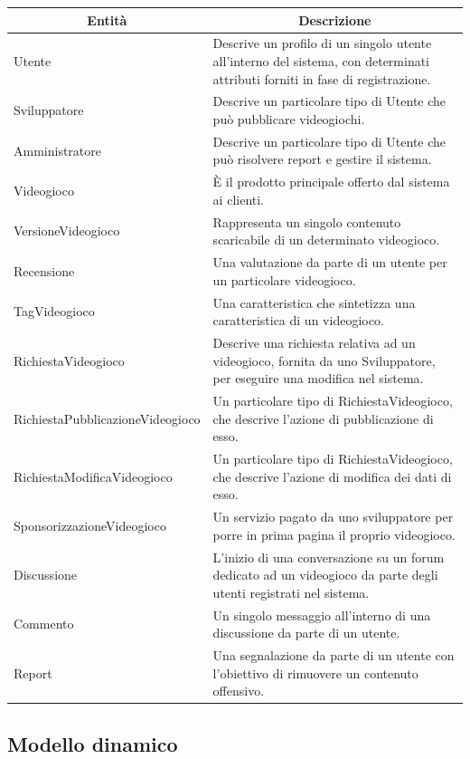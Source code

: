 \newpage
\small\begin{tabular}{|| l | p{25em} ||}
\multicolumn{1}{||c|}{\textbf{Entità}} & \multicolumn{1}{c||}{\textbf{Descrizione}} \\
\hline
Utente & Descrive un profilo di un singolo utente all’interno del sistema, con determinati attributi forniti in fase di registrazione.\\
\hline
Sviluppatore & Descrive un particolare tipo di Utente che può pubblicare videogiochi.\\
\hline
Amministratore & Descrive un particolare tipo di Utente che può risolvere report e gestire il sistema.\\
\hline
Videogioco & È il prodotto principale offerto dal sistema ai clienti.\\
\hline
VersioneVideogioco & Rappresenta un singolo contenuto scaricabile di un determinato videogioco.\\
\hline
Recensione & Una valutazione da parte di un utente per un particolare videogioco.\\
\hline
TagVideogioco & Una caratteristica che sintetizza una caratteristica di un videogioco.\\
\hline
RichiestaVideogioco & Descrive una richiesta relativa ad un videogioco, fornita da uno Sviluppatore, per eseguire una modifica nel sistema.\\
\hline
RichiestaPubblicazioneVideogioco & Un particolare tipo di RichiestaVideogioco, che descrive l’azione di pubblicazione di esso.\\
\hline
RichiestaModificaVideogioco & Un particolare tipo di RichiestaVideogioco, che descrive l’azione di modifica dei dati di esso.\\
\hline
SponsorizzazioneVideogioco & Un servizio pagato da uno sviluppatore per porre in prima pagina il proprio videogioco.\\
\hline
Discussione & L’inizio di una conversazione su un forum dedicato ad un videogioco da parte degli utenti registrati nel sistema.\\
\hline
Commento & Un singolo messaggio all’interno di una discussione da parte di un utente.\\
\hline
Report & Una segnalazione da parte di un utente con l’obiettivo di rimuovere un contenuto offensivo.\\
\hline
\end{tabular}

\newpage
\subsection{Modello dinamico}
